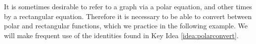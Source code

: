 It is sometimes desirable to refer to a graph via a polar equation, and other times by a rectangular equation. Therefore it is necessary to be able to convert between polar and rectangular functions, which we practice in the following example. We will make frequent use of the identities found in Key Idea \ref{idea:polarconvert}.\\


